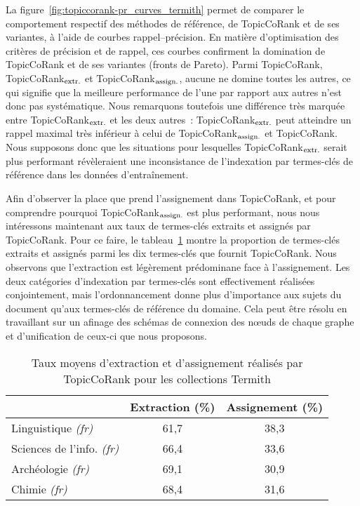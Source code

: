         La figure~\ref{fig:topiccorank-pr_curves_termith} permet de comparer le
        comportement respectif des méthodes de référence, de TopicCoRank et de
        ses variantes, à l'aide de courbes rappel--précision. En matière
        d'optimisation des critères de précision et de rappel, ces courbes
        confirment la domination de TopicCoRank et de ses variantes (fronts de
        Pareto). Parmi TopicCoRank, TopicCoRank$_\textnormal{extr.}$ et
        TopicCoRank$_\textnormal{assign.}$, aucune ne domine toutes les autres,
        ce qui signifie que la meilleure performance de l'une par rapport aux
        autres n'est donc pas systématique. Nous remarquons toutefois une
        différence très marquée entre TopicCoRank$_\textnormal{extr.}$ et les
        deux autres~: TopicCoRank$_\textnormal{extr.}$ peut atteindre un rappel
        maximal très inférieur à celui de TopicCoRank$_\textnormal{assign.}$ et
        TopicCoRank. Nous supposons donc que les situations pour lesquelles
        TopicCoRank$_\textnormal{extr.}$ serait plus performant révèleraient une
        inconsistance de l'indexation par termes-clés de référence dans les
        données d'entraînement. 
        

        Afin d'observer la place que prend l'assignement dans TopicCoRank, et
        pour comprendre pourquoi TopicCoRank$_\textnormal{assign.}$ est plus
        performant, nous nous intéressons maintenant aux taux de termes-clés
        extraits et assignés par TopicCoRank. Pour ce faire, le
        tableau~\ref{tab:assignment_ratio_termith} montre la proportion de
        termes-clés extraits et assignés parmi les dix termes-clés que fournit
        TopicCoRank. Nous observons que l'extraction est légèrement prédominane
        face à l'assignement. Les deux catégories d'indexation par termes-clés
        sont effectivement réalisées conjointement, mais l'ordonnancement donne
        plus d'importance aux sujets du document qu'aux termes-clés de référence
        du domaine. Cela peut être résolu en travaillant sur un afinage des
        schémas de connexion des n\oe{}uds de chaque graphe et d'unification de
        ceux-ci que nous proposons.
        \begin{table}[h]
          \centering
          \begin{tabular}{l|c|c}
              \toprule
              & Extraction (\%) & Assignement (\%)\\
              \hline
              Linguistique \textit{(fr)} & 61,7 & 38,3\\
              Sciences de l'info. \textit{(fr)} & 66,4 & 33,6\\
              Archéologie \textit{(fr)} & 69,1 & 30,9\\
              Chimie \textit{(fr)} & 68,4 & 31,6\\
              \bottomrule
          \end{tabular}
          \caption{Taux moyens d'extraction et d'assignement réalisés par
                   TopicCoRank pour les collections Termith
                   \label{tab:assignment_ratio_termith}}
        \end{table}

